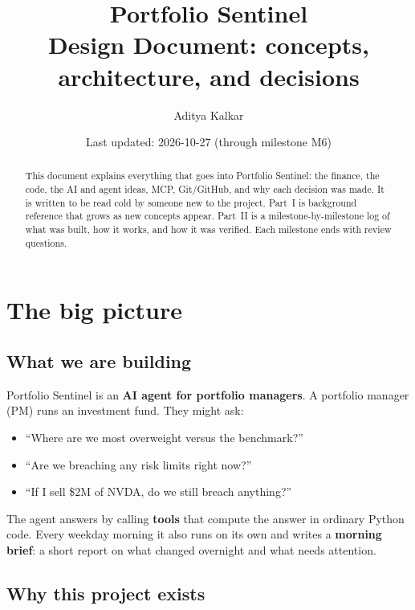 \documentclass[11pt]{article}
\title{\textbf{Portfolio Sentinel}\\[0.3em]\large Design Document: concepts, architecture, and decisions}
\author{Aditya Kalkar}
\date{Last updated: 2026-10-27 (through milestone M6)}
\begin{document}
\maketitle

\begin{abstract}
This document explains everything that goes into Portfolio Sentinel: the finance, the code,
the AI and agent ideas, MCP, Git/GitHub, and why each decision was made. It is written to be
read cold by someone new to the project. Part~I is background reference that grows as new
concepts appear. Part~II is a milestone-by-milestone log of what was built, how it works, and
how it was verified. Each milestone ends with review questions.
\end{abstract}

\tableofcontents
\newpage

\section{The big picture}

\subsection{What we are building}

Portfolio Sentinel is an \textbf{AI agent for portfolio managers}. A portfolio manager (PM)
runs an investment fund. They might ask:

\begin{itemize}
  \item ``Where are we most overweight versus the benchmark?''
  \item ``Are we breaching any risk limits right now?''
  \item ``If I sell \$2M of NVDA, do we still breach anything?''
\end{itemize}

The agent answers by calling \textbf{tools} that compute the answer in ordinary Python code.
Every weekday morning it also runs on its own and writes a \textbf{morning brief}: a short
report on what changed overnight and what needs attention.

\subsection{Why this project exists}
\end{document}

